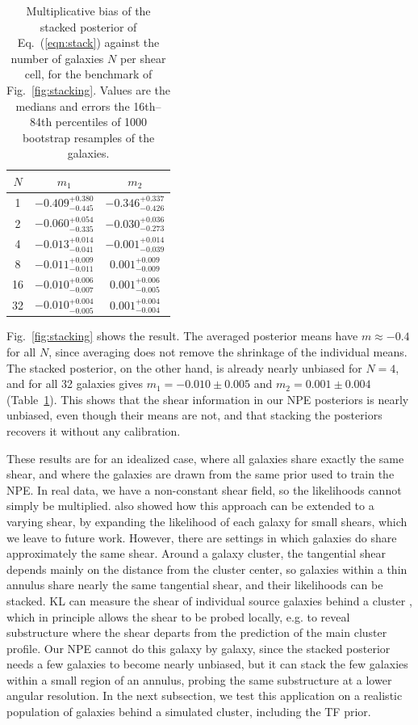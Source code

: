 \begin{table}
\centering
\caption{Multiplicative bias of the stacked posterior of Eq.~(\ref{eqn:stack}) against the number of galaxies $N$ per shear cell, for the benchmark of Fig.~\ref{fig:stacking}. Values are the medians and errors the 16th--84th percentiles of 1000 bootstrap resamples of the galaxies.}
\label{tab:stacking}
\begin{tabular}{ccc}
\toprule
$N$ & $m_1$ & $m_2$ \\
\midrule
1 & $-0.409^{+0.380}_{-0.445}$ & $-0.346^{+0.337}_{-0.426}$ \\
2 & $-0.060^{+0.054}_{-0.335}$ & $-0.030^{+0.036}_{-0.273}$ \\
4 & $-0.013^{+0.014}_{-0.041}$ & $-0.001^{+0.014}_{-0.039}$ \\
8 & $-0.011^{+0.009}_{-0.011}$ & $0.001^{+0.009}_{-0.009}$ \\
16 & $-0.010^{+0.006}_{-0.007}$ & $0.001^{+0.006}_{-0.005}$ \\
32 & $-0.010^{+0.004}_{-0.005}$ & $0.001^{+0.004}_{-0.004}$ \\
\bottomrule
\end{tabular}
\end{table}

Fig.~\ref{fig:stacking} shows the result. The averaged posterior means have $m \approx -0.4$ for all $N$, since averaging does not remove the shrinkage of the individual means. The stacked posterior, on the other hand, is already nearly unbiased for $N = 4$, and for all 32 galaxies gives $m_1 = -0.010 \pm 0.005$ and $m_2 = 0.001 \pm 0.004$ (Table~\ref{tab:stacking}). This shows that the shear information in our NPE posteriors is nearly unbiased, even though their means are not, and that stacking the posteriors recovers it without any calibration.

These results are for an idealized case, where all galaxies share exactly the same shear, and where the galaxies are drawn from the same prior used to train the NPE. In real data, we have a non-constant shear field, so the likelihoods cannot simply be multiplied. \citep{BA14} also showed how this approach can be extended to a varying shear, by expanding the likelihood of each galaxy for small shears, which we leave to future work. However, there are settings in which galaxies do share approximately the same shear. Around a galaxy cluster, the tangential shear depends mainly on the distance from the cluster center, so galaxies within a thin annulus share nearly the same tangential shear, and their likelihoods can be stacked. KL can measure the shear of individual source galaxies behind a cluster \citep{KLCluster}, which in principle allows the shear to be probed locally, e.g. to reveal substructure where the shear departs from the prediction of the main cluster profile. Our NPE cannot do this galaxy by galaxy, since the stacked posterior needs a few galaxies to become nearly unbiased, but it can stack the few galaxies within a small region of an annulus, probing the same substructure at a lower angular resolution. In the next subsection, we test this application on a realistic population of galaxies behind a simulated cluster, including the TF prior.



